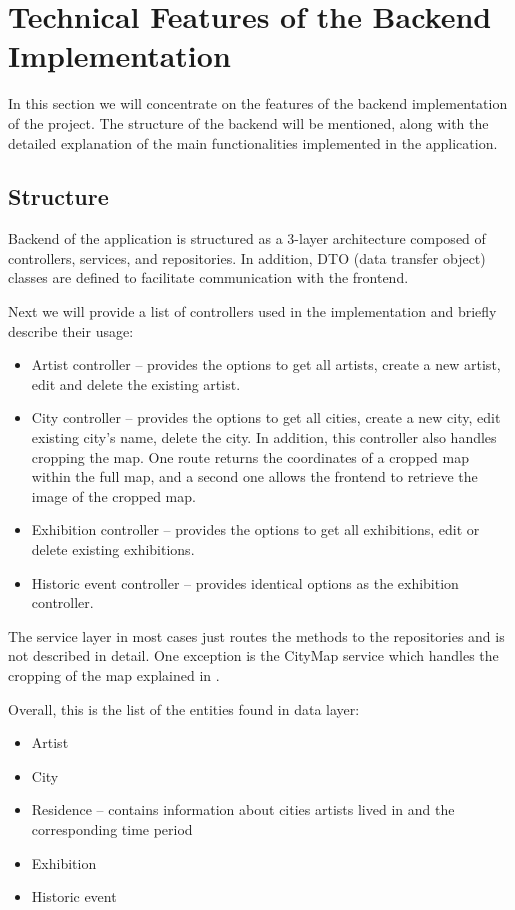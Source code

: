\section{Technical Features of the Backend Implementation}\label{sec:specifics-backend-implementation}
In this section we will concentrate on the features of the backend implementation of the project. The structure of the backend will be mentioned,
along with the detailed explanation of the main functionalities implemented in the application.

\subsection{Structure}\label{subsec:structure}
Backend of the application is structured as a 3-layer architecture composed of controllers, services, and repositories. In addition, DTO (data
transfer object) classes are defined to facilitate communication with the frontend.
\clearpage

Next we will provide a list of controllers used in the implementation and briefly describe their usage:
\begin{itemize}
    \item Artist controller -- provides the options to get all artists, create a new artist, edit and delete the existing artist.
    \item City controller -- provides the options to get all cities, create a new city, edit existing city's name, delete the city. In addition, this controller also handles cropping the map. One route returns the coordinates of a cropped map within the full map, and
            a second one allows the frontend to retrieve the image of the cropped map.
    \item Exhibition controller -- provides the options to get all exhibitions, edit or delete existing exhibitions.
    \item Historic event controller -- provides identical options as the exhibition controller.
\end{itemize}

The service layer in most cases just routes the methods to the repositories and is not described in detail. One exception is the CityMap service
which handles the cropping of the map explained in .

Overall, this is the list of the entities found in data layer:
\begin{itemize}
    \item Artist
    \item City
    \item Residence -- contains information about cities artists lived in and the corresponding time period
    \item Exhibition
    \item Historic event
\end{itemize}

